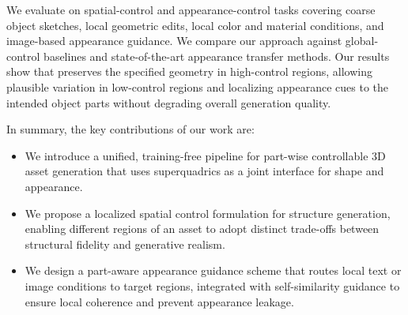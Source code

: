 
We evaluate \methodname on spatial-control and appearance-control tasks covering coarse object sketches, local geometric edits, local color and material conditions, and image-based appearance guidance. We compare our approach against global-control baselines and state-of-the-art appearance transfer methods. Our results show that \methodname preserves the specified geometry in high-control regions, allowing plausible variation in low-control regions and localizing appearance cues to the intended object parts without degrading overall generation quality.
 

In summary, the key contributions of our work are:
\begin{itemize}
    \item We introduce a unified, training-free pipeline for part-wise controllable 3D asset generation that uses superquadrics as a joint interface for shape and appearance.
    \item We propose a localized spatial control formulation for structure generation, enabling different regions of an asset to adopt distinct trade-offs between structural fidelity and generative realism.
    \item We design a part-aware appearance guidance scheme that routes local text or image conditions to target regions, integrated with self-similarity guidance to ensure local coherence and prevent appearance leakage.
\end{itemize}


